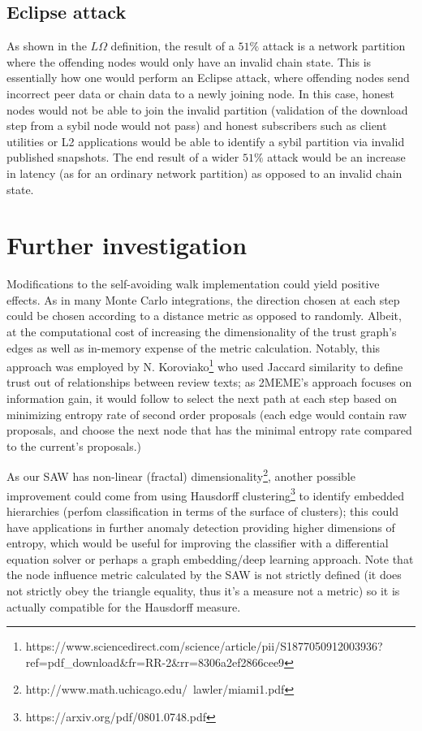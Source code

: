 \documentclass{article}
\begin{document}
\subsection{Eclipse attack}
As shown in the $L\Omega$ definition, the result of a $51\%$ attack is a network partition where the offending nodes would only have an invalid chain state. This is essentially how one would perform an Eclipse attack, where offending nodes send incorrect peer data or chain data to a newly joining node. In this case, honest nodes would not be able to join the invalid partition (validation of the download step from a sybil node would not pass) and honest subscribers such as client utilities or L2 applications would be able to identify a sybil partition via invalid published snapshots. The end result of a wider $51\%$ attack would be an increase in latency (as for an ordinary network partition) as opposed to an invalid chain state.


\section{Further investigation}
	Modifications to the self-avoiding walk implementation could yield positive effects. As in many Monte Carlo integrations, the direction chosen at each step could be chosen according to a distance metric as opposed to randomly. Albeit, at the computational cost of increasing the dimensionality of the trust graph’s edges as well as in-memory expense of the metric calculation. Notably, this approach was employed by N. Koroviako\footnote{https://www.sciencedirect.com/science/article/pii/S1877050912003936?ref=pdf\_download\&fr=RR-2\&rr=8306a2ef2866cee9} who used Jaccard similarity to define trust out of relationships between review texts; as 2MEME's approach focuses on information gain, it would follow to select the next path at each step based on minimizing entropy rate of second order proposals (each edge would contain raw proposals, and choose the next node that has the minimal entropy rate compared to the current’s proposals.)
	
	As our SAW has non-linear (fractal) dimensionality\footnote{http://www.math.uchicago.edu/~lawler/miami1.pdf}, another possible improvement could come from using Hausdorff clustering\footnote{https://arxiv.org/pdf/0801.0748.pdf} to identify embedded hierarchies (perfom classification in terms of the surface of clusters); this could have applications in further anomaly detection providing higher dimensions of entropy, which would be useful for improving the classifier with a differential equation solver or perhaps a graph embedding/deep learning approach. Note that the node influence metric calculated by the SAW is not strictly defined (it does not strictly obey the triangle equality, thus it's a measure not a metric) so it is actually compatible for the Hausdorff measure. 
	
\end{document}
